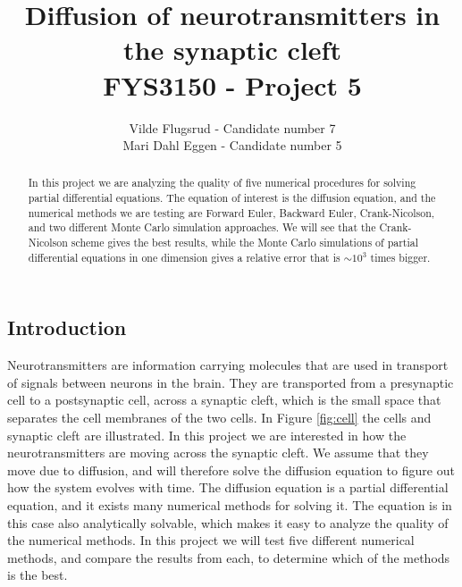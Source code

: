 \documentclass[12pt]{article}
\begin{document}
\title{Diffusion of neurotransmitters in the synaptic cleft \\
\vspace{5mm}
FYS3150 - Project 5}
\author{Vilde Flugsrud - Candidate number 7
\\ Mari Dahl Eggen - Candidate number 5}

\maketitle

\newpage

\tableofcontents

\newpage

\begin{flushleft}
\begin{abstract}
In this project we are analyzing the quality of five numerical procedures for solving partial differential equations. The equation of interest is the diffusion equation, and the numerical methods we are testing are Forward Euler, Backward Euler, Crank-Nicolson, and two different Monte Carlo simulation approaches. We will see that the Crank-Nicolson scheme gives the best results, while the Monte Carlo simulations of partial differential equations in one dimension gives a relative error that is $\sim 10^3$ times bigger.
\end{abstract}

\section{Introduction}
Neurotransmitters are information carrying molecules that are used in transport of signals between neurons in the brain. They are transported from a presynaptic cell to a postsynaptic cell, across a synaptic cleft, which is the small space that separates the cell membranes of the two cells. In Figure \ref{fig:cell} the cells and synaptic cleft are illustrated. In this project we are interested in how the neurotransmitters are moving across the synaptic cleft. We assume that they move due to diffusion, and will therefore solve the diffusion equation to figure out how the system evolves with time. The diffusion equation is a partial differential equation, and it exists many numerical methods for solving it. The equation is in this case also analytically solvable, which makes it easy to analyze the quality of the numerical methods. In this project we will test five different numerical methods, and compare the results from each, to determine which of the methods is the best.  


\end{flushleft}
\end{document}
